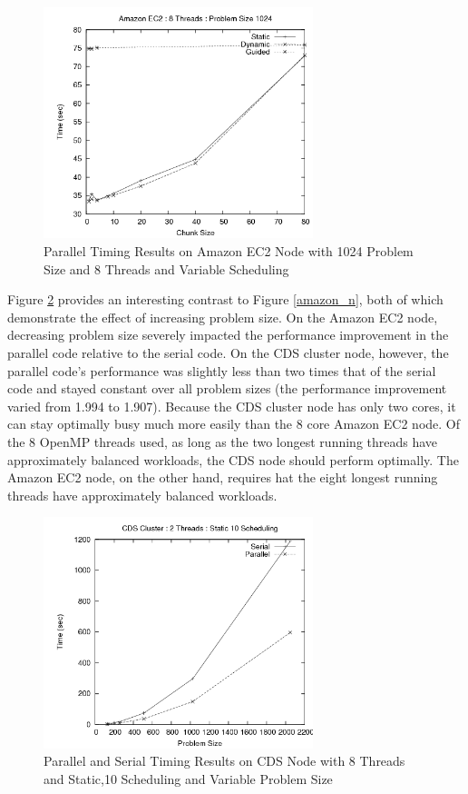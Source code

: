 \documentclass{article}
\begin{document}
\begin{figure}
\centering
\includegraphics[width=0.7\textwidth]{../data/amazon_chunk.png}
\caption{Parallel Timing Results on Amazon EC2 Node with 1024 Problem Size and 8 Threads and Variable Scheduling}
\label{amazon_chunk}
\end{figure}

Figure \ref{cds_n} provides an interesting contrast to Figure \ref{amazon_n}, both of which demonstrate the effect of increasing problem size. On the Amazon EC2 node, decreasing problem size severely impacted the performance improvement in the parallel code relative to the serial code. On the CDS cluster node, however, the parallel code's performance was slightly less than two times that of the serial code and stayed constant over all problem sizes (the performance improvement varied from 1.994 to 1.907). Because the CDS cluster node has only two cores, it can stay optimally busy much more easily than the 8 core Amazon EC2 node. Of the 8 OpenMP threads used, as long as the two longest running threads have approximately balanced workloads, the CDS node should perform optimally. The Amazon EC2 node, on the other hand, requires hat the eight longest running threads have approximately balanced workloads.

\begin{figure}
\centering
\includegraphics[width=0.7\textwidth]{../data/cds_n.png}
\caption{Parallel and Serial Timing Results on CDS Node with 8 Threads and Static,10 Scheduling and Variable Problem Size}
\label{cds_n}
\end{figure}
\end{document}
